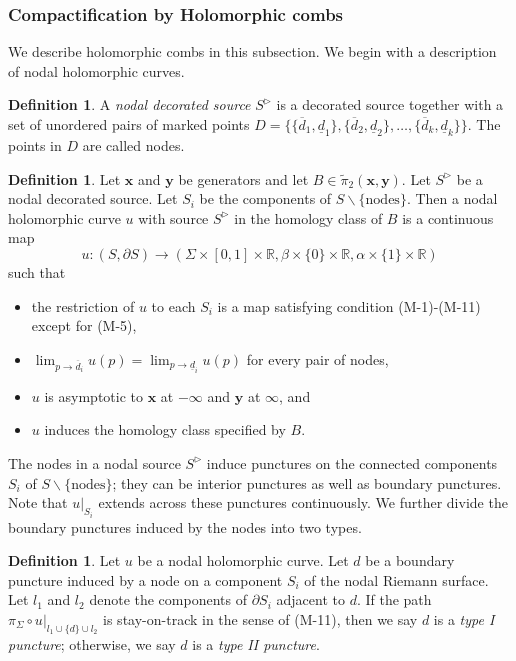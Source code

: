 \documentclass{amsart}
\theoremstyle{definition}
\newtheorem{defn}[thm]{Definition}
\theoremstyle{remark}
\numberwithin{equation}{section}
\numberwithin{equation}{section} \makeatletter
\begin{document}
\subsubsection{Compactification by Holomorphic combs}\label{subsubsection, holomorphic combs}
We describe holomorphic combs in this subsection. We begin with a description of nodal holomorphic curves. 
\begin{defn}
A \emph{nodal decorated source} $S^\triangleright$ is a decorated source together with a set of unordered pairs of marked points $D=\{\{\overline{d}_1,\underline{d}_1\},\{\overline{d}_2,\underline{d}_2\},\ldots,\{\overline{d}_k,\underline{d}_k\}\}$. The points in $D$ are called nodes. 
\end{defn}

\begin{defn}
Let $\bm{x}$ and $\bm{y}$ be generators and let $B\in\widetilde{\pi}_2(\bm{x},\bm{y})$. Let $S^\triangleright$ be a nodal decorated source. Let $S_i$ be the components of $S\backslash\{\text{nodes}\}$. Then a nodal holomorphic curve $u$ with source $S^\triangleright$ in the homology class of $B$ is a continuous map $$u:(S,\partial S)\rightarrow (\Sigma\times [0,1]\times \mathbb{R}, \beta\times\{0\}\times \mathbb{R}, \alpha \times \{1\} \times \mathbb{R})$$ such that 
\begin{itemize}
\item[(1)] the restriction of $u$ to each $S_i$ is a map satisfying condition (M-1)-(M-11) except for (M-5), 
\item[(2)] $\lim_{p\rightarrow \overline{d}_{i}}u(p)=\lim_{p\rightarrow \underline{d}_{i}}u(p)$ for every pair of nodes, 
\item[(3)] $u$ is asymptotic to $\bm{x}$ at $-\infty$ and $\bm{y}$ at $\infty$, and 
\item[(4)] $u$ induces the homology class specified by $B$.
\end{itemize}
\end{defn}

The nodes in a nodal source $S^\triangleright$ induce punctures on the connected components $S_i$ of $S\backslash\{\text{nodes}\}$; they can be interior punctures as well as boundary punctures.  Note that $u|_{S_i}$ extends across these punctures continuously. We further divide the boundary punctures induced by the nodes into two types.
\begin{defn}\label{Definition, type I type II node}
Let $u$ be a nodal holomorphic curve. Let $d$ be a boundary puncture induced by a node on a component $S_i$ of the nodal Riemann surface. Let $l_1$ and $l_2$ denote the components of $\partial S_i$ adjacent to $d$. If the path $\pi_{\Sigma}\circ u|_{l_1\cup\{d\}\cup l_2}$ is stay-on-track in the sense of (M-11), then we say $d$ is a \emph{type I puncture}; otherwise, we say $d$ is a \emph{type II puncture}.    
\end{defn}
\end{document}
